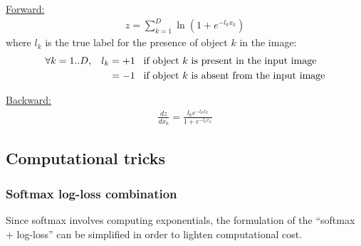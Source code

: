 \noindent
\underline{Forward:}
\begin{align}
 z = \sum_{k=1}^D \ln (1+e^{-l_k x_k}) \nonumber
\end{align}
where $l_k$ is the true label for the presence of object $k$ in the image:
\begin{align}
 \forall k = 1..D, \hspace{0.3cm} 
    l_k &=+1 \hspace{0.3cm} \text{if object $k$ is present in the input image} \nonumber \\
        &=-1 \hspace{0.3cm} \text{if object $k$ is absent from the input image} \nonumber
\end{align}


\noindent
\underline{Backward:}
\begin{align}
 \frac{dz}{dx_k} = \frac{l_k e^{-l_k x_k}}{1+e^{-l_k x_k}} \nonumber
\end{align}






\subsection{Computational tricks}

\subsubsection{Softmax log-loss combination}

  \begin{center}
  \end{center}
Since softmax involves computing exponentials, the formulation of the ``softmax + log-loss'' can be simplified in order to lighten computational 
cost. 

